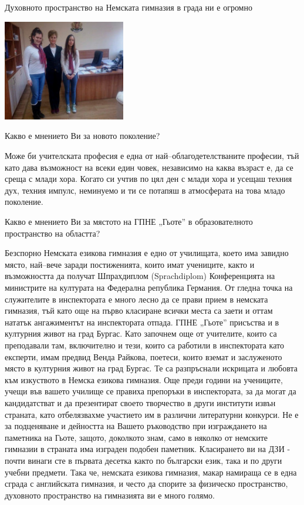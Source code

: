 \begin{multicols}{3}Духовното пространство на Немската гимназия  в града ни е огромно

\includegraphics[width=2.1in]{./Ilieva/Ilieva.jpg}

Какво е мнението Ви за новото поколение?

Може би учителската професия е една от най–облагодетелстваните професии, тъй като дава възможност на всеки един човек, независимо на каква възраст е, да се среща с млади хора. Когато си учтив по цял ден с млади хора и усещаш техния дух, техния импулс, неминуемо и ти се потапяш в атмосферата на това младо поколение.

Какво е мнението Ви за мястото на ГПНЕ „Гьоте” в образователното пространство 
на областта?

Безспорно Немската езикова гимназия е едно от училищата, което има завидно място, най–вече заради постиженията, които имат учениците, както и възможността да получат Шпрахдиплом (Sprachdiplom) Конференцията на министрите на културата на Федерална република Германия. От гледна точка на служителите в инспектората е 
много лесно да се прави прием в немската гимназия, тъй като още на първо класиране всички места са заети и оттам нататък ангажиментът на инспектората отпада. ГПНЕ „Гьоте” присъства и в културния живот на град Бургас. Като започнем още от учителите, които са преподавали там, включително и тези, които са работили в инспектората като експерти, имам предвид Венда Райкова, поетеси, които вземат и заслуженото място в културния живот на град Бургас. Те са разпръснали искрицата и любовта към изкуството в Немска езикова гимназия. Още 
преди години на учениците, учещи във вашето училище се правиха препоръки в инспектората, за да могат да кандидатстват и да презентират своето творчество в други институти извън страната, като отбелязвахме участието им в различни литературни конкурси. Не е за подценяване и дейността на Вашето ръководство при изграждането на паметника на Гьоте, защото, доколкото знам, само в няколко от немските гимназии в страната има изграден подобен паметник. Класирането ви на 
ДЗИ - почти винаги сте в първата десетка както по български език, така и по други учебни предмети. Така че, немската езикова гимназия, макар намираща се в една сграда с английската гимназия, и често да спорите за физическо пространство, духовното пространство на гимназията ви е много голямо.


\end{multicols}
